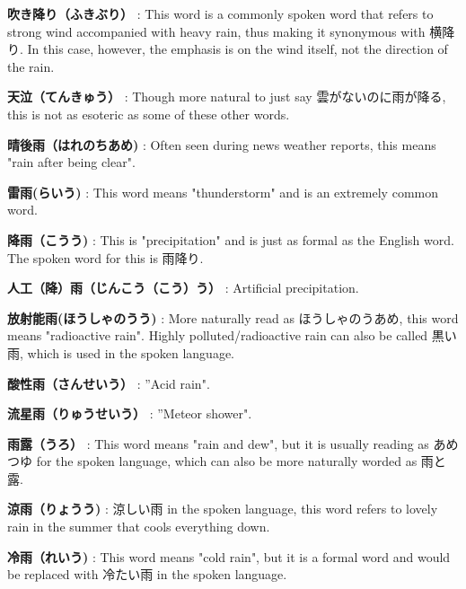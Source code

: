 \par{\textbf{吹き降り（ふきぶり） }: This word is a commonly spoken word that refers to strong wind accompanied with heavy rain, thus making it synonymous with 横降り. In this case, however, the emphasis is on the wind itself, not the direction of the rain. }

\par{\textbf{天泣（てんきゅう） }: Though more natural to just say 雲がないのに雨が降る, this is not as esoteric as some of these other words. }

\par{\textbf{晴後雨（はれのちあめ) }: Often seen during news weather reports, this means "rain after being clear". }

\par{\textbf{雷雨(らいう) }: This word means "thunderstorm" and is an extremely common word. }

\par{\textbf{降雨（こうう) }: This is "precipitation" and is just as formal as the English word. The spoken word for this is 雨降り. }

\par{\textbf{人工（降）雨（じんこう（こう）う） }: Artificial precipitation. }

\par{\textbf{放射能雨(ほうしゃのうう) }: More naturally read as ほうしゃのうあめ, this word means "radioactive rain". Highly polluted\slash radioactive rain can also be called 黒い雨, which is used in the spoken language. }

\par{\textbf{酸性雨（さんせいう） }: ”Acid rain". }

\par{\textbf{流星雨（りゅうせいう） }: ”Meteor shower". }

\par{\textbf{雨露（うろ） }: This word means "rain and dew", but it is usually reading as あめつゆ for the spoken language, which can also be more naturally worded as 雨と露. }

\par{\textbf{涼雨（りょうう) }: 涼しい雨 in the spoken language, this word refers to lovely rain in the summer that cools everything down. }

\par{\textbf{冷雨（れいう) }: This word means "cold rain", but it is a formal word and would be replaced with 冷たい雨 in the spoken language. }

